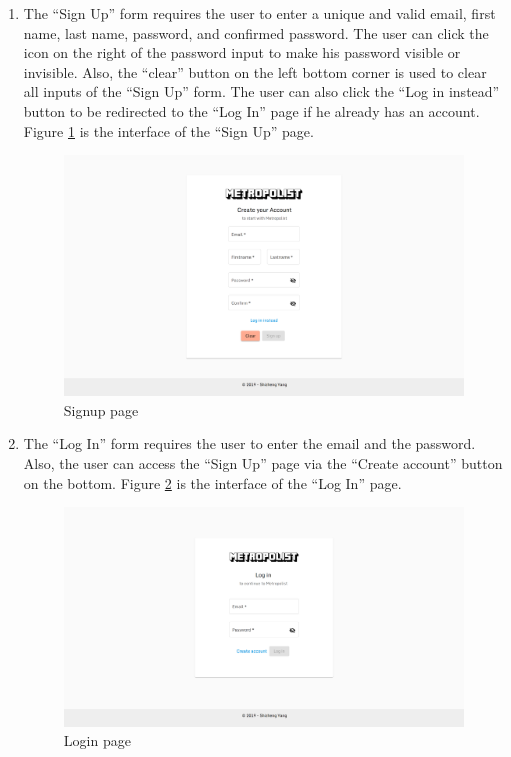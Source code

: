 \begin{enumerate}
  \item The ``Sign Up'' form requires the user to enter a unique and valid email, first name, last name, password, and confirmed password. The user can click the icon on the right of the password input to make his password visible or invisible. Also, the ``clear'' button on the left bottom corner is used to clear all inputs of the ``Sign Up'' form. The user can also click the ``Log in instead'' button to be redirected to the ``Log In'' page if he already has an account. Figure \ref{fig:GUI signup} is the interface of the ``Sign Up'' page.

  \begin{figure}[htbp]
    \includegraphics[width=\textwidth]{section04/assets/GUI-signup.png}
    \caption{Signup page}
    \label{fig:GUI signup}
  \end{figure}

  \item The ``Log In'' form requires the user to enter the email and the password. Also, the user can access the ``Sign Up'' page via the ``Create account'' button on the bottom. Figure \ref{fig:GUI login} is the interface of the ``Log In'' page.

  \begin{figure}[htbp]
    \includegraphics[width=\textwidth]{section04/assets/GUI-login.png}
    \caption{Login page}
    \label{fig:GUI login}
  \end{figure}


\end{enumerate}
